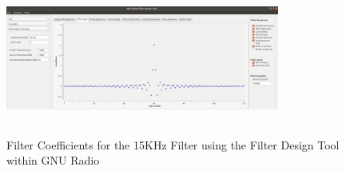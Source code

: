 \begin{figure}[h!]
	\centering
	\includegraphics[height = 5cm, width =9cm]{filter_tool_15kHz_taps.png} %
	\caption{Filter Coefficients for the 15KHz Filter using the Filter Design Tool within GNU Radio}
	\label{fig:taps15}
\end{figure}   
  
 
